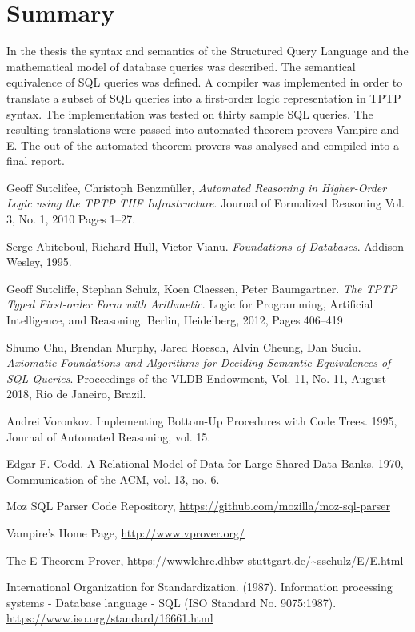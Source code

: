 \documentclass[magisterska,en]{pracamgr}
\begin{document}
\chapter{Summary}
In the thesis the syntax and semantics of the Structured Query Language and the mathematical model of database queries was described. The semantical equivalence of SQL queries was defined. A compiler was implemented in order to translate a subset of SQL queries into a first-order logic representation in TPTP syntax. The implementation was tested on thirty sample SQL queries. The resulting translations were passed into automated theorem provers Vampire and E. The out of the automated theorem provers was analysed and compiled into a final report.

\begin{thebibliography}{99}

 Geoff Sutclifee, Christoph Benzm\"uller, \textit{Automated Reasoning in Higher-Order Logic using the TPTP THF Infrastructure}. Journal of Formalized Reasoning Vol. 3, No. 1, 2010 Pages 1–27.

 Serge Abiteboul, Richard Hull, Victor Vianu. \textit{Foundations of Databases}. Addison-Wesley, 1995.

 Geoff Sutcliffe, Stephan Schulz, Koen Claessen, Peter Baumgartner. \textit{The TPTP Typed First-order Form with Arithmetic}. Logic for Programming, Artificial Intelligence, and Reasoning. Berlin, Heidelberg, 2012, Pages 406--419

 Shumo Chu, Brendan Murphy, Jared Roesch, Alvin Cheung, Dan Suciu. \textit{Axiomatic Foundations and Algorithms for Deciding Semantic Equivalences of SQL Queries}. Proceedings of the VLDB Endowment, Vol. 11, No. 11, August 2018, Rio de Janeiro, Brazil.

 Andrei Voronkov. Implementing Bottom-Up Procedures with Code Trees. 1995, Journal of Automated Reasoning, vol. 15.

 Edgar F. Codd. A Relational Model of Data for Large Shared Data Banks. 1970, Communication of the ACM, vol. 13, no. 6.

 Moz SQL Parser Code Repository, \url{https://github.com/mozilla/moz-sql-parser}

 Vampire's Home Page, \url{http://www.vprover.org/}

 The E Theorem Prover, \url{https://wwwlehre.dhbw-stuttgart.de/~sschulz/E/E.html}

International Organization for Standardization. (1987). Information processing systems - Database language - SQL (ISO Standard No. 9075:1987). \url{https://www.iso.org/standard/16661.html}


\end{thebibliography}
\end{document}
